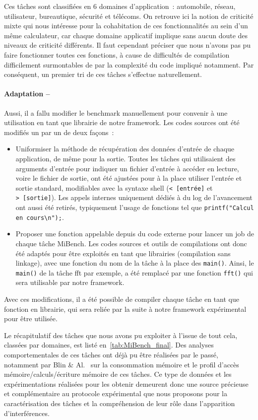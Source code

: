 \documentclass[french, a4paper, 11pt, twoside, pdftex]{StyleThese}
\begin{document}
    
    Ces tâches sont classifiées en 6 domaines d'application~: automobile, réseau, utilisateur, bureautique, sécurité et télécoms. On retrouve ici la notion de criticité mixte qui nous intéresse pour la cohabitation de ces fonctionnalités au sein d'un même calculateur, car chaque domaine applicatif implique sans aucun doute des niveaux de criticité différents.
    Il faut cependant préciser que nous n'avons pas pu faire fonctionner toutes ces fonctions, à cause de difficultés de compilation difficilement surmontables de par la complexité du code impliqué notamment. Par conséquent, un premier tri de ces tâches s'effectue naturellement. 
    
 	\paragraph{Adaptation --} Aussi, il a fallu modifier le benchmark manuellement pour convenir à une utilisation en tant que librairie de notre framework. Les codes sources ont été modifiés un par un de deux façons~: 
	\begin{itemize}
		\item  	Uniformiser la méthode de récupération des données d'entrée de chaque application, de même pour la sortie. Toutes les tâches qui utilisaient des arguments d'entrée pour indiquer un fichier d'entrée à accéder en lecture, voire le fichier de sortie, ont été ajustées pour à la place utiliser l'entrée et sortie standard, modifiables avec la syntaxe shell (\texttt{<~[entrée]} et \texttt{>~[sortie]}). Les appels internes uniquement dédiés à du log de l'avancement ont aussi été retirés, typiquement l'usage de fonctions tel que \texttt{printf("Calcul en cours\textbackslash{}n");}.
		\item  	Proposer une fonction appelable depuis du code externe pour lancer un job de chaque tâche MiBench. Les codes sources et outils de compilations ont donc été adaptés pour être exploités en tant que librairies (compilation sans linkage), avec une fonction du nom de la tâche à la place des \texttt{main()}. Ainsi, le \texttt{main()} de la tâche fft par exemple, a été remplacé par une fonction \texttt{fft()} qui sera utilisable par notre framework.
	\end{itemize} Avec ces modifications, il a été possible de compiler chaque tâche en tant que fonction en librairie, qui sera reliée par la suite à notre framework expérimental pour être utilisée.

 	Le récapitulatif des tâches que nous avons pu exploiter à l'issue de tout cela, classées par domaines, est listé en~\autoref{tab:MiBench_final}. Des analyses comportementales de ces tâches ont déjà pu être réalisées par le passé, notamment par Blin \& Al.~\cite{blin_understanding_2016} sur la consommation mémoire et le profil d'accès mémoire/calculs/écriture mémoire de ces tâches. Ce type de données et les expérimentations réalisées pour les obtenir demeurent donc une source précieuse et complémentaire au protocole expérimental que nous proposons pour la caractérisation des tâches et la compréhension de leur rôle dans l'apparition d'interférences.
    
\end{document}
